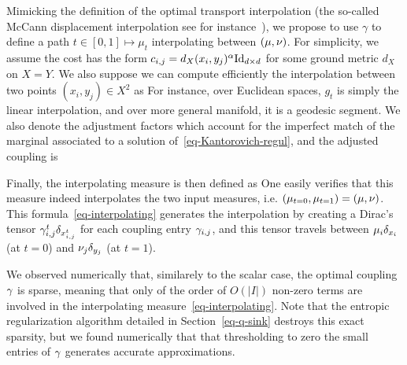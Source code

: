 Mimicking the definition of the optimal transport interpolation (the so-called McCann displacement interpolation see for instance~\cite{santambrogio2015optimal}), we propose to use $\gamma$ to define a path $t \in [0,1] \mapsto \mu_t$ interpolating between $(\mu,\nu)$. 
%
For simplicity, we assume the cost has the form $c_{i,j}=d_X(x_i,y_j)^\alpha \mathrm{Id}_{d \times d}$ for some ground metric $d_X$ on $X=Y$. We also suppose we can compute efficiently the interpolation between two points $(x_i,y_j) \in X^2$ as
For instance, over Euclidean spaces, $g_t$ is simply the linear interpolation, and over more general manifold, it is a geodesic segment.
We also denote
the adjustment factors which account for the imperfect match of the marginal associated to a solution of~\eqref{eq-Kantorovich-regul}, and the adjusted coupling is

Finally, the interpolating measure is then defined as
One easily verifies that this measure indeed interpolates the two input measures, i.e. 
$(\mu_{t=0},\mu_{t=1})=(\mu,\nu)$. 
%
This formula~\eqref{eq-interpolating} generates the interpolation by creating a Dirac's tensor $ \gamma_{i,j}^t \delta_{x_{i,j}^t}$ for each coupling entry $\gamma_{i,j}$, and this tensor travels between $\mu_i \delta_{x_i}$ (at $t=0$) and $\nu_j \delta_{y_j}$ (at $t=1$).

\begin{rem} We observed numerically that, similarely to the scalar case, the optimal coupling $\gamma$ is sparse, meaning that only of the order of $O(|I|)$ non-zero terms are involved in the interpolating measure~\eqref{eq-interpolating}. Note that the entropic regularization algorithm detailed in Section~\ref{eq-q-sink} destroys this exact sparsity, but we found numerically that that thresholding to zero the small entries of $\gamma$ generates accurate approximations. 
\end{rem}





